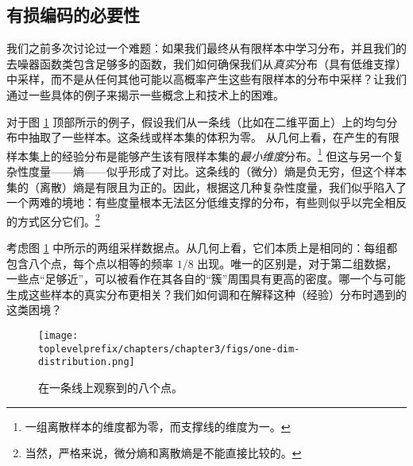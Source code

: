 \documentclass[../../book-main_zh.tex]{subfiles}
\begin{document}
\subsection{有损编码的必要性}



我们之前多次讨论过一个难题：如果我们最终从有限样本中学习分布，并且我们的去噪器函数类包含足够多的函数，我们如何确保我们从\textit{真实}分布（具有低维支撑）中采样，而不是从任何其他可能以高概率产生这些有限样本的分布中采样？让我们通过一些具体的例子来揭示一些概念上和技术上的困难。

\begin{example}[体积、维度和熵]\label{eg:measures-of-complexity}
对于图 \ref{fig:1d-line} 顶部所示的例子，假设我们从一条线（比如在二维平面上）上的均匀分布中抽取了一些样本。这条线或样本集的体积为零。
从几何上看，在产生的有限样本集上的经验分布是能够产生该有限样本集的{\em 最小维度}分布。\footnote{一组离散样本的维度都为零，而支撑线的维度为一。} 但这与另一个复杂性度量——熵——似乎形成了对比。这条线的（微分）熵是负无穷，但这个样本集的（离散）熵是有限且为正的。因此，根据这几种复杂性度量，我们似乎陷入了一个两难的境地：有些度量根本无法区分低维支撑的分布，有些则似乎以完全相反的方式区分它们。\footnote{当然，严格来说，微分熵和离散熵是不能直接比较的。}
\end{example}

\begin{example}[密度]\label{eg:density} 考虑图 \ref{fig:1d-line} 中所示的两组采样数据点。从几何上看，它们本质上是相同的：每组都包含八个点，每个点以相等的频率 $1/8$ 出现。唯一的区别是，对于第二组数据，一些点“足够近”，可以被看作在其各自的“簇”周围具有更高的密度。哪一个与可能生成这些样本的真实分布更相关？我们如何调和在解释这种（经验）分布时遇到的这类困境？
\begin{figure}[t]
	\centering
	\texttt{[image: \\toplevelprefix/chapters/chapter3/figs/one-dim-distribution.png]}
	\caption{在一条线上观察到的八个点。}
	\label{fig:1d-line}
\end{figure}
\end{example}
\end{document}
